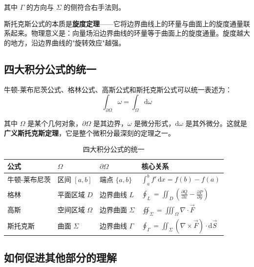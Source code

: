 其中 $\Gamma$ 的方向与 $\Sigma$ 的侧符合右手法则。

\begin{essencebox}
斯托克斯公式的本质是\textbf{旋度定理}——它将边界曲线上的环量与曲面上的旋度通量联系起来。物理意义是：向量场沿边界曲线的环量等于曲面上的旋度通量。旋度越大的地方，沿边界曲线的"旋转效应"越强。
\end{essencebox}

\subsection{四大积分公式的统一}

牛顿-莱布尼茨公式、格林公式、高斯公式和斯托克斯公式可以统一表述为：
\[
\int_{\partial\Omega} \omega = \int_\Omega \mathrm{d}\omega
\]

其中 $\Omega$ 是某个几何对象，$\partial\Omega$ 是其边界，$\omega$ 是微分形式，$\mathrm{d}\omega$ 是其外微分。这就是\textbf{广义斯托克斯定理}，它是整个微积分最深刻的定理之一。

\begin{table}[htbp]
\centering
\caption{四大积分公式的统一}
\begin{tabularx}{0.95\textwidth}{llll}
\toprule
\textbf{公式} & \textbf{$\Omega$} & \textbf{$\partial\Omega$} & \textbf{核心关系} \\
\midrule
牛顿-莱布尼茨 & 区间 $[a,b]$ & 端点 $\{a,b\}$ & $\int_a^b f'\,\mathrm{d}x = f(b)-f(a)$ \\
格林 & 平面区域 $D$ & 边界曲线 $L$ & $\oint_L = \iint_D (\frac{\partial Q}{\partial x}-\frac{\partial P}{\partial y})$ \\
高斯 & 空间区域 $\Omega$ & 边界曲面 $\Sigma$ & $\oiint_\Sigma = \iiint_\Omega \nabla\cdot\vec{F}$ \\
斯托克斯 & 曲面 $\Sigma$ & 边界曲线 $\Gamma$ & $\oint_\Gamma = \iint_\Sigma (\nabla\times\vec{F})\cdot\mathrm{d}\vec{S}$ \\
\bottomrule
\end{tabularx}
\end{table}

\subsection{如何促进其他部分的理解}

